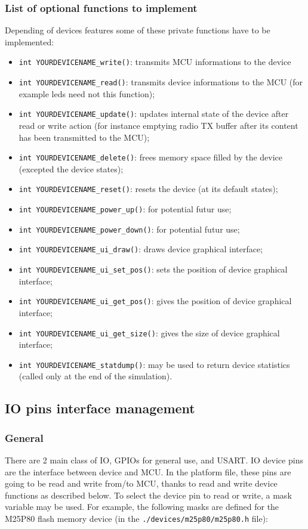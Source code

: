 \documentclass[a4paper,10pt]{report}
\begin{document}
\subsubsection{List of optional functions to implement}
Depending of devices features some of these private functions have to be implemented:
\begin{itemize}
  \item \verb$int YOURDEVICENAME_write()$: transmits MCU informations to the device
  \item \verb$int YOURDEVICENAME_read()$: transmits device informations to the MCU (for example leds need not this function);
  \item \verb$int YOURDEVICENAME_update()$: updates internal state of the device after read or write action (for instance emptying radio TX buffer after its content has been transmitted to the MCU);
  \item \verb$int YOURDEVICENAME_delete()$: frees memory space filled by the device (excepted the device states);
  \item \verb$int YOURDEVICENAME_reset()$: resets the device (at its default states);
  \item \verb$int YOURDEVICENAME_power_up()$: for potential futur use;
  \item \verb$int YOURDEVICENAME_power_down()$: for potential futur use;
  \item \verb$int YOURDEVICENAME_ui_draw()$: draws device graphical interface;
  \item \verb$int YOURDEVICENAME_ui_set_pos()$: sets the position of device graphical interface;
  \item \verb$int YOURDEVICENAME_ui_get_pos()$: gives the position of device graphical interface;
  \item \verb$int YOURDEVICENAME_ui_get_size()$: gives the size of device graphical interface;
  \item \verb$int YOURDEVICENAME_statdump()$: may be used to return device statistics (called only at the end of the simulation).
\end{itemize}

\subsection{IO pins interface management}
\subsubsection{General}
There are 2 main class of IO, GPIOs for general use, and USART. IO device pins are the interface between device and MCU. In the platform file, these pins are going to be read and write from/to MCU, thanks to read and write device functions as described below. To select the device pin to read or write, a mask variable may be used. For example, the following masks are defined for the M25P80 flash memory device (in the \verb$./devices/m25p80/m25p80.h$ file):
\end{document}
